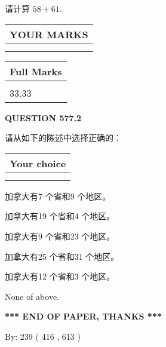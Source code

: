 \documentclass{ctexart}
\begin{document}
  
 
请计算 $ %
58 +  %
61 $.
 

 

 
  
\vspace{0.2in}
  
\noindent\begin{tabular}{|l|}
\hline
 YOUR MARKS  \\
\hline
 \\ 
 \\ 
\hline
\end{tabular}
\hspace{0.05in} \begin{tabular}{|l|}
\hline
 Full Marks  \\
\hline
 \\ 
33.33 \\
\hline
\end{tabular}
{\textbf{\Large{QUESTION
577.2 
}}}
  
  
请从如下的陈述中选择正确的：
  
  
\noindent\hspace{3.0in} \begin{tabular}{|l|}
\hline
Your choice \\
\hline
 \\ 
 \\ 
\hline
\end{tabular}
  
  
 
 
加拿大有7 个省和9 个地区。
 
 
加拿大有19 个省和4 个地区。
 
 
加拿大有9 个省和23 个地区。
 
 
加拿大有25 个省和31 个地区。
 
 
加拿大有12 个省和3 个地区。
 
 
 None of above.
 
 
   
   
 \vspace{0.2in}
 
   
   
   
   
\vspace{1.0in} 
{\textbf{\large{ *** END OF PAPER, THANKS *** }}} 
   
   
\hspace{1.0in} By: 
 239 ( 416 ,  613 )
   
\end{document}
